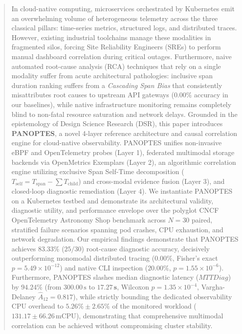 \documentclass[sigconf, balance=false]{acmart}
\begin{document}
\begin{abstract}
In cloud-native computing, microservices orchestrated by Kubernetes emit an overwhelming volume of heterogeneous telemetry across the three classical pillars: time-series metrics, structured logs, and distributed traces. However, existing industrial toolchains manage these modalities in fragmented silos, forcing Site Reliability Engineers (SREs) to perform manual dashboard correlation during critical outages. Furthermore, naive automated root-cause analysis (RCA) techniques that rely on a single modality suffer from acute architectural pathologies: inclusive span duration ranking suffers from a \textit{Cascading Span Bias} that consistently misattributes root causes to upstream API gateways ($0.00\%$ accuracy in our baselines), while native infrastructure monitoring remains completely blind to non-fatal resource saturation and network delays. Grounded in the epistemology of Design Science Research (DSR), this paper introduces \textbf{PANOPTES}, a novel 4-layer reference architecture and causal correlation engine for cloud-native observability. PANOPTES unifies non-invasive eBPF and OpenTelemetry probes (Layer 1), federated multimodal storage backends via OpenMetrics Exemplars (Layer 2), an algorithmic correlation engine utilizing exclusive Span Self-Time decomposition ($T_{\text{self}} = T_{\text{span}} - \sum T_{\text{child}}$) and cross-modal evidence fusion (Layer 3), and closed-loop diagnostic remediation (Layer 4). We instantiate PANOPTES on a Kubernetes testbed and demonstrate its architectural validity, diagnostic utility, and performance envelope over the polyglot CNCF OpenTelemetry Astronomy Shop benchmark across $N=30$ paired, stratified failure scenarios spanning pod crashes, CPU exhaustion, and network degradation. Our empirical findings demonstrate that PANOPTES achieves $\mathbf{83.33\%}$ ($25/30$) root-cause diagnostic accuracy, decisively outperforming monomodal distributed tracing ($0.00\%$, Fisher's exact $p = 5.49 \times 10^{-12}$) and native CLI inspection ($20.00\%$, $p = 1.55 \times 10^{-6}$). Furthermore, PANOPTES slashes median diagnostic latency ($MTTDiag$) by $\mathbf{94.24\%}$ (from $300.00\,\text{s}$ to $\mathbf{17.27\,\text{s}}$, Wilcoxon $p = 1.35 \times 10^{-4}$, Vargha-Delaney $\hat{A}_{12} = 0.817$), while strictly bounding the dedicated observability CPU overhead to $\mathbf{5.26\% \pm 2.65\%}$ of the monitored workload ($131.17 \pm 66.26\,\text{mCPU}$), demonstrating that comprehensive multimodal correlation can be achieved without compromising cluster stability.
\end{abstract}
\end{document}
